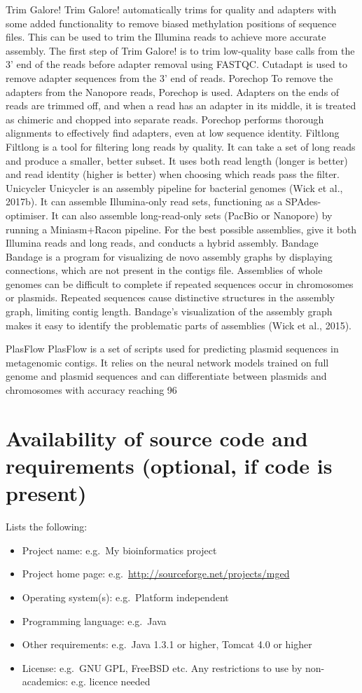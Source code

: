 \documentclass[a4paper,num-refs]{oup-contemporary}
\begin{document}
Trim Galore!
Trim Galore! automatically trims for quality and adapters with some added functionality to remove biased methylation positions of sequence files. This can be used to trim the Illumina reads to achieve more accurate assembly. The first step of Trim Galore! is to trim low-quality base calls from the 3' end of the reads before adapter removal using FASTQC. Cutadapt is used to remove adapter sequences from the 3’ end of reads.
Porechop
To remove the adapters from the Nanopore reads, Porechop is used. Adapters on the ends of reads are trimmed off, and when a read has an adapter in its middle, it is treated as chimeric and chopped into separate reads. Porechop performs thorough alignments to effectively find adapters, even at low sequence identity.
Filtlong
Filtlong is a tool for filtering long reads by quality. It can take a set of long reads and produce a smaller, better subset. It uses both read length (longer is better) and read identity (higher is better) when choosing which reads pass the filter.
Unicycler
Unicycler is an assembly pipeline for bacterial genomes (Wick et al., 2017b). It can assemble Illumina-only read sets, functioning as a SPAdes-optimiser. It can also assemble long-read-only sets (PacBio or Nanopore) by running a Miniasm+Racon pipeline. For the best possible assemblies, give it both Illumina reads and long reads, and conducts a hybrid assembly.
Bandage
Bandage is a program for visualizing de novo assembly graphs by displaying connections, which are not present in the contigs file. Assemblies of whole genomes can be difficult to complete if repeated sequences occur in chromosomes or plasmids. Repeated sequences cause distinctive structures in the assembly graph, limiting contig length. Bandage’s visualization of the assembly graph makes it easy to identify the problematic parts of assemblies (Wick et al., 2015).

PlasFlow
PlasFlow is a set of scripts used for predicting plasmid sequences in metagenomic contigs. It relies on the neural network models trained on full genome and plasmid sequences and can differentiate between plasmids and chromosomes with accuracy reaching 96%



\section{Availability of source code and requirements (optional, if code is present)}

Lists the following:
\begin{itemize}
\item Project name: e.g.~My bioinformatics project
\item Project home page: e.g.~\url{http://sourceforge.net/projects/mged}
\item Operating system(s): e.g.~Platform independent
\item Programming language: e.g.~Java
\item Other requirements: e.g.~Java 1.3.1 or higher, Tomcat 4.0 or higher
\item License: e.g.~GNU GPL, FreeBSD etc.
Any restrictions to use by non-academics: e.g. licence needed
\end{itemize}
\end{document}
